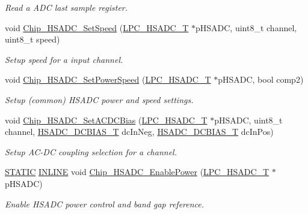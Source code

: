 \begin{DoxyCompactItemize}
\begin{DoxyCompactList}\small\item\em Read a A\+DC last sample register. \end{DoxyCompactList}\item 
void \hyperlink{group___h_s_a_d_c__18_x_x__43_x_x_ga70b879056a35cdf9cc6f9c2928883973}{Chip\+\_\+\+H\+S\+A\+D\+C\+\_\+\+Set\+Speed} (\hyperlink{struct_l_p_c___h_s_a_d_c___t}{L\+P\+C\+\_\+\+H\+S\+A\+D\+C\+\_\+T} $\ast$p\+H\+S\+A\+DC, uint8\+\_\+t channel, uint8\+\_\+t speed)
\begin{DoxyCompactList}\small\item\em Setup speed for a input channel. \end{DoxyCompactList}\item 
void \hyperlink{group___h_s_a_d_c__18_x_x__43_x_x_ga776d07e6bc51347515f92ed36a9da561}{Chip\+\_\+\+H\+S\+A\+D\+C\+\_\+\+Set\+Power\+Speed} (\hyperlink{struct_l_p_c___h_s_a_d_c___t}{L\+P\+C\+\_\+\+H\+S\+A\+D\+C\+\_\+T} $\ast$p\+H\+S\+A\+DC, bool comp2)
\begin{DoxyCompactList}\small\item\em Setup (common) H\+S\+A\+DC power and speed settings. \end{DoxyCompactList}\item 
void \hyperlink{group___h_s_a_d_c__18_x_x__43_x_x_gaf754b858ff1c0c0d2993aaedad394867}{Chip\+\_\+\+H\+S\+A\+D\+C\+\_\+\+Set\+A\+C\+D\+C\+Bias} (\hyperlink{struct_l_p_c___h_s_a_d_c___t}{L\+P\+C\+\_\+\+H\+S\+A\+D\+C\+\_\+T} $\ast$p\+H\+S\+A\+DC, uint8\+\_\+t channel, \hyperlink{group___h_s_a_d_c__18_x_x__43_x_x_ga1769145f3b2f1c12f4cd23d3b5151e93}{H\+S\+A\+D\+C\+\_\+\+D\+C\+B\+I\+A\+S\+\_\+T} dc\+In\+Neg, \hyperlink{group___h_s_a_d_c__18_x_x__43_x_x_ga1769145f3b2f1c12f4cd23d3b5151e93}{H\+S\+A\+D\+C\+\_\+\+D\+C\+B\+I\+A\+S\+\_\+T} dc\+In\+Pos)
\begin{DoxyCompactList}\small\item\em Setup A\+C-\/\+DC coupling selection for a channel. \end{DoxyCompactList}\item 
\hyperlink{group___l_p_c___types___public___macros_ga10b2d890d871e1489bb02b7e70d9bdfb}{S\+T\+A\+T\+IC} \hyperlink{spifi__18xx__43xx_8h_a2eb6f9e0395b47b8d5e3eeae4fe0c116}{I\+N\+L\+I\+NE} void \hyperlink{group___h_s_a_d_c__18_x_x__43_x_x_gab95b239db991c736bfb93db97d8794d9}{Chip\+\_\+\+H\+S\+A\+D\+C\+\_\+\+Enable\+Power} (\hyperlink{struct_l_p_c___h_s_a_d_c___t}{L\+P\+C\+\_\+\+H\+S\+A\+D\+C\+\_\+T} $\ast$p\+H\+S\+A\+DC)
\begin{DoxyCompactList}\small\item\em Enable H\+S\+A\+DC power control and band gap reference. \end{DoxyCompactList}\item 

\end{DoxyCompactItemize}

